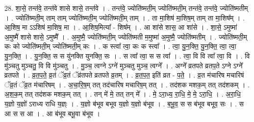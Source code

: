 \documentclass[17pt]{extarticle}
\begin{document}
28. शा॒से॒ तन्त॑वे॒ तन्त॑वे शासे शासे॒ तन्त॑वे । . तन्त॑वे॒ ज्योति॑ष्मती॒म् ज्योति॑ष्मती॒म् तन्त॑वे॒ तन्त॑वे॒ ज्योति॑ष्मतीम् । . ज्योति॑ष्मती॒म् ताम् ताम् ज्योति॑ष्मती॒म् ज्योति॑ष्मती॒म् ताम् । . ता मा॒शिष॑ मा॒शिष॒म् ताम् ता मा॒शिष᳚म् । . आ॒शिष॒ मा ऽऽशिष॑ मा॒शिष॒ मा । . आ॒शिष॒मित्या᳚ - शिष᳚म् । . आ शा॑से शास॒ आ शा॑से । . शा॒से॒ ऽमुष्मा॑ अ॒मुष्मै॑ शासे शासे॒ ऽमुष्मै᳚ । . अ॒मुष्मै॒ ज्योति॑ष्मती॒म् ज्योति॑ष्मती म॒मुष्मा॑ अ॒मुष्मै॒ ज्योति॑ष्मतीम् । . ज्योति॑ष्मती॒म् कः को ज्योति॑ष्मती॒म् ज्योति॑ष्मती॒म् कः । . क स्त्वा᳚ त्वा॒ कः क स्त्वा᳚ । . त्वा॒ यु॒न॒क्ति॒ यु॒न॒क्ति॒ त्वा॒ त्वा॒ यु॒न॒क्ति॒ । . यु॒न॒क्ति॒ स स यु॑नक्ति युनक्ति॒ सः । . स त्वा᳚ त्वा॒ स स त्वा᳚ । . त्वा॒ वि वि त्वा᳚ त्वा॒ वि । . वि मु॑ञ्चतु मुञ्चतु॒ वि वि मु॑ञ्चतु । . मु॒ञ्च॒ त्वग्ने ऽग्ने॑ मुञ्चतु मुञ्च॒ त्वग्ने᳚ । . अग्ने᳚ व्रतपते व्रतप॒ते ऽग्ने ऽग्ने᳚ व्रतपते । . व्र॒त॒प॒ते॒ व्र॒तं ॅव्र॒तं ॅव्र॑तपते व्रतपते व्र॒तम् । . व्र॒त॒प॒त॒ इति॑ व्रत - प॒ते॒ । . व्र॒त म॑चारिष मचारिषं ॅव्र॒तं ॅव्र॒त म॑चारिषम् । . अ॒चा॒रि॒ष॒म् तत् तद॑चारिष मचारिष॒म् तत् । . तद॑शक मशक॒म् तत् तद॑शकम् । . अ॒श॒क॒म् तत् तद॑शक मशक॒म् तत् । . तन् मे॑ मे॒ तत् तन् मे᳚ । . मे॒ ऽरा॒ध्य॒ रा॒धि॒ मे॒ मे॒ ऽरा॒धि॒ । . अ॒रा॒धि॒ य॒ज्ञो य॒ज्ञो॑ ऽराध्य राधि य॒ज्ञ्ः । . य॒ज्ञो ब॑भूव बभूव य॒ज्ञो य॒ज्ञो ब॑भूव । . ब॒भू॒व॒ स स ब॑भूव बभूव॒ सः । . स आ स स आ । . आ ब॑भूव बभू॒वा ब॑भूव । \newline
\end{document}
